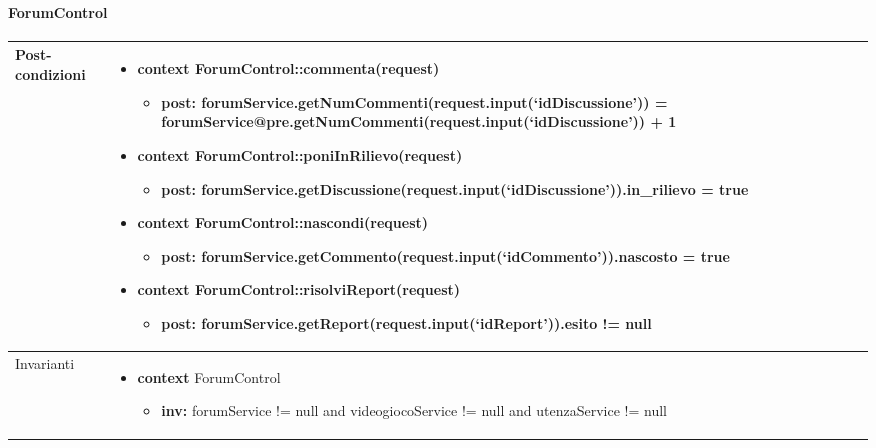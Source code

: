 \paragraph{ForumControl}
\small\begin{tabular}{|| l | p{28em} ||} 
\hline
Post-condizioni & \begin{itemize}[leftmargin=*]
	\item \textbf{context} ForumControl::commenta(request)
	\begin{itemize}
		\item[ ] \textbf{post:} forumService\newline .getNumCommenti(request.input(‘idDiscussione’)) = forumService\newline @pre.getNumCommenti(request.input(‘idDiscussione’)) + 1
	\end{itemize}

	\item \textbf{context} ForumControl::poniInRilievo(request)
	\begin{itemize}
		\item[ ] \textbf{post:} forumService\newline .getDiscussione(request.input(‘idDiscussione’)).in\_rilievo = true
	\end{itemize}

	\item \textbf{context} ForumControl::nascondi(request)
	\begin{itemize}
		\item[ ] \textbf{post:} forumService\newline .getCommento(request.input(‘idCommento’)).nascosto = true
	\end{itemize}

	\item \textbf{context} ForumControl::risolviReport(request)
	\begin{itemize}
		\item[ ] \textbf{post:} forumService\newline .getReport(request.input(‘idReport’)).esito != null
	\end{itemize}
\end{itemize}\\
\hline
Invarianti & \begin{itemize}
	\item \textbf{context} ForumControl
	\begin{itemize}
		\item[ ] \textbf{inv:} forumService != null and videogiocoService != null and utenzaService != null
	\end{itemize}
\end{itemize}\\
\hline
\end{tabular}


